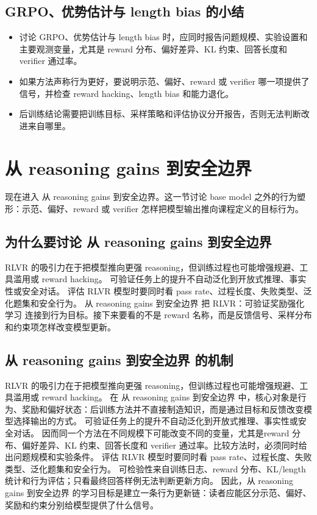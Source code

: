\documentclass[a4paper]{article}
\begin{document}
\subsection{GRPO、优势估计与 length bias 的小结}
\begin{itemize}
\item 讨论 GRPO、优势估计与 length bias 时，应同时报告问题规模、实验设置和主要观测变量，尤其是 reward 分布、偏好差异、KL 约束、回答长度和 verifier 通过率。
\item 如果方法声称行为更好，要说明示范、偏好、reward 或 verifier 哪一项提供了信号，并检查 reward hacking、length bias 和能力退化。
\item 后训练结论需要把训练目标、采样策略和评估协议分开报告，否则无法判断改进来自哪里。
\end{itemize}
\section{从 reasoning gains 到安全边界}
现在进入 从 reasoning gains 到安全边界。这一节讨论 base model 之外的行为塑形：示范、偏好、reward 或 verifier 怎样把模型输出推向课程定义的目标行为。
\subsection{为什么要讨论 从 reasoning gains 到安全边界}
RLVR 的吸引力在于把模型推向更强 reasoning，但训练过程也可能增强规避、工具滥用或 reward hacking。
可验证任务上的提升不自动泛化到开放式推理、事实性或安全对话。
评估 RLVR 模型时要同时看 pass rate、过程长度、失败类型、泛化题集和安全行为。
从 reasoning gains 到安全边界 把 RLVR：可验证奖励强化学习 连接到行为目标。接下来要看的不是 reward 名称，而是反馈信号、采样分布和约束项怎样改变模型更新。
\subsection{从 reasoning gains 到安全边界 的机制}
RLVR 的吸引力在于把模型推向更强 reasoning，但训练过程也可能增强规避、工具滥用或 reward hacking。 在 从 reasoning gains 到安全边界 中，核心对象是行为、奖励和偏好状态：后训练方法并不直接制造知识，而是通过目标和反馈改变模型选择输出的方式。
可验证任务上的提升不自动泛化到开放式推理、事实性或安全对话。 因而同一个方法在不同规模下可能改变不同的变量，尤其是reward 分布、偏好差异、KL 约束、回答长度和 verifier 通过率。比较方法时，必须同时给出问题规模和实验条件。
评估 RLVR 模型时要同时看 pass rate、过程长度、失败类型、泛化题集和安全行为。 可检验性来自训练日志、reward 分布、KL/length 统计和行为评估；只看最终回答样例无法判断更新方向。
因此，从 reasoning gains 到安全边界 的学习目标是建立一条行为更新链：读者应能区分示范、偏好、奖励和约束分别给模型提供了什么信号。
\end{document}
